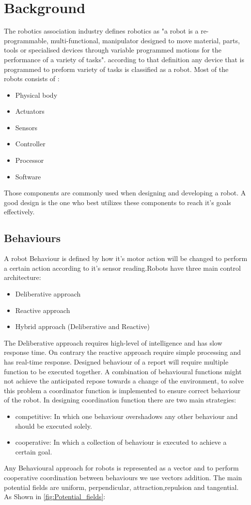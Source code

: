 \section{Background} \label{sec:background}
The robotics association industry defines robotics as "a robot is a re-programmable, multi-functional, manipulator designed to move material, parts, tools or specialised devices through variable programmed motions for the performance of a variety of tasks". according to that definition any device that is programmed to preform variety of tasks is classified as a robot. Most of the robots consists of :
\begin{itemize}
	\item Physical body
	\item Actuators
	\item Sensors
	\item Controller
	\item Processor
	\item Software 
\end{itemize}
Those components are commonly used when designing and developing a robot. A good design is the one who best utilizes these components to reach it's goals effectively.
\subsection{Behaviours}
A robot Behaviour is defined by how it's motor action will be changed to perform a certain action according to it's sensor reading.Robots have three main control architecture:
\begin{itemize}
	\item Deliberative approach
	\item Reactive approach
	\item Hybrid approach (Deliberative and Reactive) 
\end{itemize}

The Deliberative approach requires high-level of intelligence and has slow response time. On contrary the reactive approach require simple processing and has real-time response. 
Designed behaviour of a report will require multiple function to be executed together. A combination of behavioural functions might not achieve the anticipated repose towards a change of the environment, to solve this problem a coordinator function is implemented to ensure correct behaviour of the robot. In designing coordination function there are two main strategies:
\begin{itemize}
	\item competitive: In which one behaviour overshadows any other behaviour and should be executed solely.
	\item cooperative: In which a collection of behaviour is executed to achieve a certain goal.
\end{itemize} 
Any Behavioural approach for robots is represented as a vector and to perform cooperative coordination between behaviours we use vectors addition. The main potential fields are uniform, perpendicular, attraction,repulsion and tangential. As Shown in {\ref{fig:Potential_fields}}:

